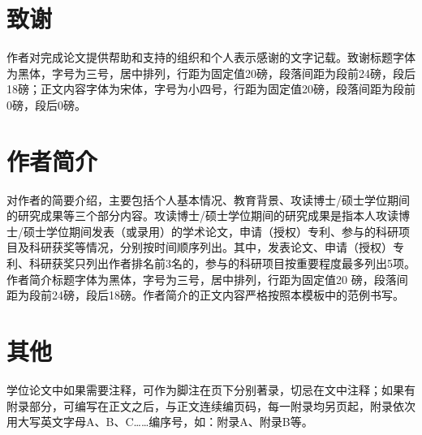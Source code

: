 \section{致谢}
作者对完成论文提供帮助和支持的组织和个人表示感谢的文字记载。致谢标题字体为黑体，字号为三号，居中排列，行距为固定值20磅，段落间距为段前24磅，段后18磅；正文内容字体为宋体，字号为小四号，行距为固定值20磅，段落间距为段前0磅，段后0磅。
\section{作者简介}
对作者的简要介绍，主要包括个人基本情况、教育背景、攻读博士/硕士学位期间的研究成果等三个部分内容。攻读博士/硕士学位期间的研究成果是指本人攻读博士/硕士学位期间发表（或录用）的学术论文，申请（授权）专利、参与的科研项目及科研获奖等情况，分别按时间顺序列出。其中，发表论文、申请（授权）专利、科研获奖只列出作者排名前3名的，参与的科研项目按重要程度最多列出5项。作者简介标题字体为黑体，字号为三号，居中排列，行距为固定值20 磅，段落间距为段前24磅，段后18磅。作者简介的正文内容严格按照本模板中的范例书写。
\section{其他}
学位论文中如果需要注释，可作为脚注在页下分别著录，切忌在文中注释；如果有附录部分，可编写在正文之后，与正文连续编页码，每一附录均另页起，附录依次用大写英文字母A、B、C……编序号，如：附录A、附录B等。
